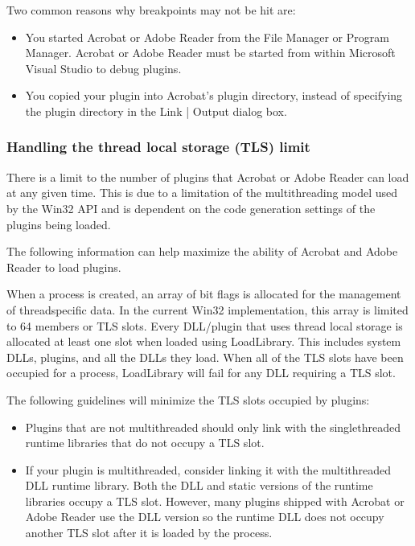 \documentclass[letterpaper,12pt,english,openany,oneside]{sphinxmanual}
\begin{document}
Two common reasons why breakpoints may not be hit are:
\begin{itemize}
\item {} 
You started Acrobat or Adobe Reader from the File Manager or Program Manager. Acrobat or Adobe Reader must be started from within Microsoft Visual Studio to debug plugins.

\item {} 
You copied your plugin into Acrobat’s plugin directory, instead of specifying the plugin directory in the Link | Output dialog box.

\end{itemize}


\subsubsection{Handling the thread local storage (TLS) limit}
\label{\detokenize{Plugins_CreatingSimplePlug:handling-the-thread-local-storage-tls-limit}}
There is a limit to the number of plugins that Acrobat or Adobe Reader can load at any given time. This is due to a limitation of the multi\sphinxhyphen{}threading model used by the Win32 API and is dependent on the code generation settings of the plugins being loaded.

The following information can help maximize the ability of Acrobat and Adobe Reader to load plugins.

When a process is created, an array of bit flags is allocated for the management of thread\sphinxhyphen{}specific data. In the current Win32 implementation, this array is limited to 64 members or TLS slots. Every DLL/plugin that uses thread local storage is allocated at least one slot when loaded using LoadLibrary. This includes system DLLs, plugins, and all the DLLs they load. When all of the TLS slots have been occupied for a process, LoadLibrary will fail for any DLL requiring a TLS slot.

The following guidelines will minimize the TLS slots occupied by plugins:
\begin{itemize}
\item {} 
Plugins that are not multi\sphinxhyphen{}threaded should only link with the single\sphinxhyphen{}threaded run\sphinxhyphen{}time libraries that do not occupy a TLS slot.

\item {} 
If your plugin is multi\sphinxhyphen{}threaded, consider linking it with the multi\sphinxhyphen{}threaded DLL run\sphinxhyphen{}time library. Both the DLL and static versions of the run\sphinxhyphen{}time libraries occupy a TLS slot. However, many plugins shipped with Acrobat or Adobe Reader use the DLL version so the run\sphinxhyphen{}time DLL does not occupy another TLS slot after it is loaded by the process.

\end{itemize}
\end{document}
